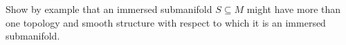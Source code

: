 Show by example that an immersed submanifold $S \subseteq M$ might have more than one topology and smooth structure with respect to which it is an immersed submanifold.